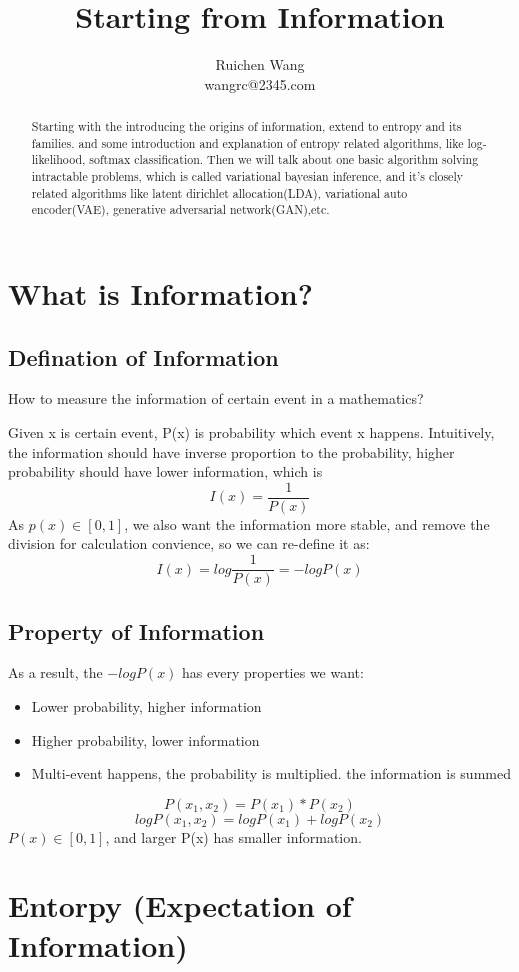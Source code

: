 \documentclass{article}
\author{Ruichen Wang \\
wangrc@2345.com}
\title{Starting from Information}
\begin{document}
\maketitle
\begin{abstract}
Starting with the introducing the origins of information, extend to entropy and its families. and some introduction and explanation of entropy related algorithms, like log-likelihood, softmax classification. Then we will talk about one basic algorithm solving intractable problems, which is called variational bayesian inference, and it's  closely related algorithms like latent dirichlet allocation(LDA), variational auto encoder(VAE), generative adversarial network(GAN),etc.
\end{abstract}

\tableofcontents
\section{What is Information?} 
\subsection{Defination of Information}
How to measure the information of certain event in a mathematics?

Given x is certain event, P(x) is probability which event x happens. Intuitively, the information should have inverse proportion to the probability, higher probability should have lower information, which is 
$$I(x)=\frac{1}{P(x)}$$
As $p(x) \in [0,1] $, we also want the information more stable, and remove the division for calculation convience, so we can re-define it as:
$$I(x)=log\frac{1}{P(x)}=-logP(x)$$
\subsection{Property of Information}
As a result, the $-logP(x)$ has every properties we want:
\begin{itemize}
\item Lower probability, higher information
\item Higher probability, lower information
\item Multi-event happens, the probability is multiplied. the information is summed
\end{itemize}
$$P(x_{1},x_{2})=P(x_{1})*P(x_{2})$$
$$logP(x_{1},x_{2})=logP(x_{1})+logP(x_{2})$$
$P(x) \in [0,1]$, and larger P(x) has smaller information.
\section{Entorpy (Expectation of Information)}
\end{document}
